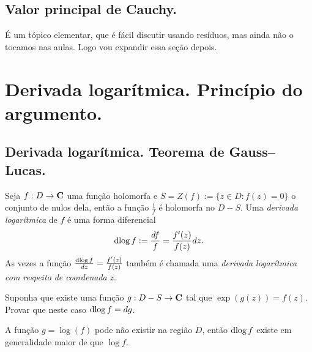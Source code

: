 \subsection{Valor principal de Cauchy.}
É um tópico elementar, que é fácil discutir usando resíduos,
mas ainda não o tocamos nas aulas. Logo vou expandir essa seção depois.

\section{Derivada logarítmica. Princípio do argumento.}

\subsection{Derivada logarítmica. Teorema de Gauss--Lucas.}

\begin{defin}
Seja $f : D \to \mathbf{C}$ uma função holomorfa
e $S = Z(f) := \{ z\in D: f(z) = 0 \}$ o conjunto de nulos dela,
então a função $\frac{1}{f}$ é holomorfa no $D-S$.
Uma \emph{derivada logarítmica} de $f$ é uma forma diferencial
\begin{equation}
\operatorname{dlog} f := \frac{df}{f} = \frac{f'(z)}{f(z)} dz.
\end{equation}
As vezes a função $\frac{\operatorname{dlog} f}{dz} = \frac{f'(z)}{f(z)}$ também é chamada uma \emph{derivada logarítmica}
\emph{com respeito de coordenada} $z$.
\end{defin}

\begin{problema}
Suponha que existe uma função $g: D-S\to\mathbf{C}$ tal que $\exp(g(z)) = f(z)$.
Provar que neste caso $\operatorname{dlog} f = dg$.
\end{problema}

A função $g=\log(f)$ pode não existir na região $D$, então $\operatorname{dlog} f$ existe em generalidade
maior de que $\log f$.

